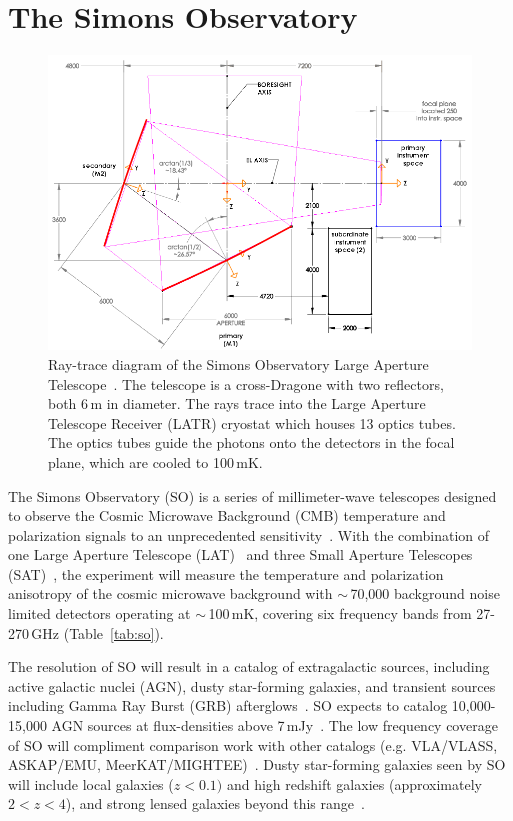 \section{The Simons Observatory}

\begin{figure}[t]
    \centering
    \includegraphics[width = .95\textwidth]{Figures/LAT_rt.pdf}
    \caption{Ray-trace diagram of the Simons Observatory Large Aperture Telescope~\cite{Parshley_2018}.  The telescope is a cross-Dragone with two reflectors, both 6\,m in diameter.  The rays trace into the Large Aperture Telescope Receiver (LATR) cryostat which houses 13 optics tubes.  The optics tubes guide the photons onto the detectors in the focal plane, which are cooled to 100\,mK.}
    \label{fig:so_inst}
\end{figure}

The Simons Observatory (SO) is a series of millimeter-wave telescopes designed to observe the Cosmic Microwave Background (CMB) temperature and polarization signals to an unprecedented sensitivity~\cite{gali18, so19}. With the combination of one Large Aperture Telescope (LAT)~\cite{xu/etal:2020c, zhu18, orlo18, coppi/etal:2018} and three Small Aperture Telescopes (SAT)~\cite{ali20}, the experiment will measure the temperature and polarization anisotropy of the cosmic microwave background with $\sim$\,70,000 background noise limited detectors operating at $\sim$\,100\,mK, covering six frequency bands from 27-270\,GHz (Table~\ref{tab:so}).

The resolution of SO will result in a catalog of extragalactic sources, including active galactic nuclei (AGN), dusty star-forming galaxies, and transient sources including Gamma Ray Burst (GRB) afterglows~\cite{so_science}.  SO expects to catalog 10,000-15,000 AGN sources at flux-densities above 7\,mJy~\cite{Tucci_2011}.  The low frequency coverage of SO will compliment comparison work with other catalogs (e.g. VLA/VLASS, ASKAP/EMU, MeerKAT/MIGHTEE)~\cite{so_science}.  Dusty star-forming galaxies seen by SO will include local galaxies ($z<0.1)$ and high redshift galaxies (approximately $2<z<4$), and strong lensed galaxies beyond this range~\cite{Marrone_2017}.


